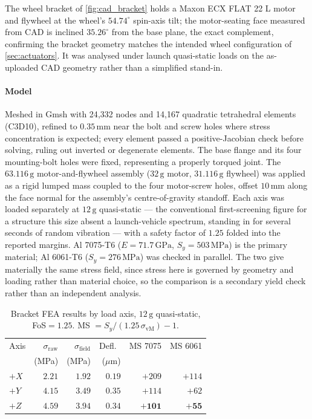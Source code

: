 \documentclass[conference,10pt,a4paper]{IEEEtran}
\newcommand{\unit}[1]{\ensuremath{\,\mathrm{#1}}}
\begin{document}
The wheel bracket of \cref{fig:cad_bracket} holds a Maxon ECX FLAT 22 L motor
and flywheel at the wheel's $54.74^\circ$ spin-axis tilt; the motor-seating
face measured from CAD is inclined $35.26^\circ$ from the base plane, the exact
complement, confirming the bracket geometry matches the intended wheel
configuration of \cref{sec:actuators}. It was analysed under launch
quasi-static loads on the as-uploaded CAD geometry rather than a simplified
stand-in.

\paragraph{Model} Meshed in Gmsh with 24{,}332 nodes and 14{,}167 quadratic
tetrahedral elements (C3D10), refined to $0.35\unit{mm}$ near the bolt and
screw holes where stress concentration is expected; every element passed a
positive-Jacobian check before solving, ruling out inverted or degenerate
elements. The base flange and its four mounting-bolt holes were fixed,
representing a properly torqued joint. The $63.116\unit{g}$ motor-and-flywheel
assembly ($32\unit{g}$ motor, $31.116\unit{g}$ flywheel) was applied as a rigid
lumped mass coupled to the four motor-screw holes, offset $10\unit{mm}$ along
the face normal for the assembly's centre-of-gravity standoff. Each axis was
loaded separately at $12\unit{g}$ quasi-static --- the conventional
first-screening figure for a structure this size absent a launch-vehicle
spectrum, standing in for several seconds of random vibration --- with a
safety factor of $1.25$ folded into the reported margins. Al 7075-T6
($E=71.7\unit{GPa}$, $S_y=503\unit{MPa}$) is the primary material; Al 6061-T6
($S_y=276\unit{MPa}$) was checked in parallel. The two give materially the same
stress field, since stress here is governed by geometry and loading rather
than material choice, so the comparison is a secondary yield check rather than
an independent analysis.

\begin{table}[!t]
\centering
\caption{Bracket FEA results by load axis, $12\unit{g}$ quasi-static,
FoS$=1.25$. MS $=S_y/(1.25\,\sigma_\text{vM})-1$.}
\label{tab:fea}
\footnotesize
\begin{tabular}{@{}lrrrrr@{}}
\toprule
Axis & $\sigma_\text{raw}$ & $\sigma_\text{field}$ & Defl.\ & MS 7075 & MS 6061 \\
 & (MPa) & (MPa) & ($\mu$m) & & \\
\midrule
$+X$ & $2.21$ & $1.92$ & $0.19$ & $+209$ & $+114$ \\
$+Y$ & $4.15$ & $3.49$ & $0.35$ & $+114$ & $+62$ \\
$+Z$ & $4.59$ & $3.94$ & $0.34$ & $\mathbf{+101}$ & $\mathbf{+55}$ \\
\bottomrule
\end{tabular}
\end{table}
\end{document}
